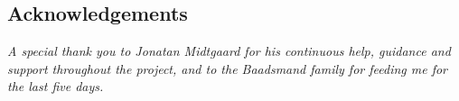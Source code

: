 \begin{center}
  \section*{Acknowledgements}
  \emph{A special thank you to Jonatan Midtgaard for his continuous help, guidance and support throughout the project, and to the Baadsmand family for feeding me for the last five days.}
\end{center}
\restoregeometry
